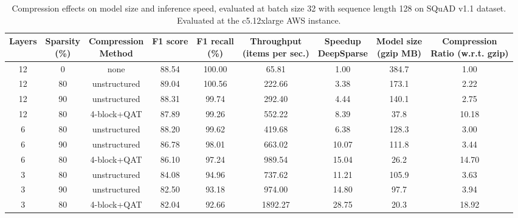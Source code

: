 \documentclass[11pt]{article}
\newcommand{\greyrule}{\arrayrulecolor{black!30}\midrule\arrayrulecolor{black}}
\begin{document}
\begin{table}[h!]
\setlength{\tabcolsep}{4pt}
    \centering
    {\small 
    \begin{tabular}{ccccccccc}
    \toprule 
    \makecell{Layers\\\phantom{x}} & \makecell{Sparsity\\(\%)} & \makecell{Compression\\Method} & \makecell{F1 score\\\phantom{x}} & \makecell{F1 recall\\(\%)} & \makecell{Throughput\\(items per sec.)} & \makecell{Speedup\\DeepSparse} & \makecell{Model size\\ (gzip MB)} & \makecell{Compression\\Ratio (w.r.t. gzip)} \\
    \midrule
    12 & 0 & none & 88.54 & 100.00 & \phantom{11}65.81 & \phantom{1}1.00 & 384.7 & \phantom{1}1.00 \\
    \greyrule
    12 & 80 & unstructured & 89.04 & 100.56 & \phantom{1}222.66 & \phantom{1}3.38 & 173.1 & \phantom{1}2.22 \\
    12 & 90 & unstructured & 88.31 & \phantom{1}99.74 & \phantom{1}292.40 & \phantom{1}4.44 & 140.1 & \phantom{1}2.75 \\
    12 & 80 & 4-block+QAT & 87.89 & \phantom{1}99.26 & \phantom{1}552.22 & \phantom{1}8.39 & \phantom{1}37.8 & 10.18\\
    \greyrule
    6 & 80 & unstructured & 88.20 & \phantom{1}99.62 & \phantom{1}419.68 & \phantom{1}6.38 & 128.3 & \phantom{1}3.00 \\
    6 & 90 & unstructured & 86.78 & \phantom{1}98.01 & \phantom{1}663.02 & 10.07 & 111.8 & \phantom{1}3.44 \\
    6 & 80 & 4-block+QAT & 86.10 & \phantom{1}97.24 & \phantom{1}989.54 & 15.04 & \phantom{1}26.2 & 14.70\\
    \greyrule
    3 & 80 & unstructured & 84.08 & \phantom{1}94.96 & \phantom{1}737.62 & 11.21 & 105.9 & \phantom{1}3.63 \\
    3 & 90 & unstructured & 82.50 & \phantom{1}93.18 & \phantom{1}974.00 & 14.80 & \phantom{1}97.7 & \phantom{1}3.94 \\
    3 & 80 & 4-block+QAT & 82.04 & \phantom{1}92.66 & 1892.27 & 28.75 & \phantom{1}20.3 & 18.92\\
    \bottomrule
    \end{tabular}
    }
    \caption{Compression effects on model size and inference speed, evaluated at batch size 32 with sequence length 128 on SQuAD v1.1 dataset. Evaluated at the c5.12xlarge AWS instance.}
    \label{tab:deepsparseresults}
\end{table}
\end{document}
